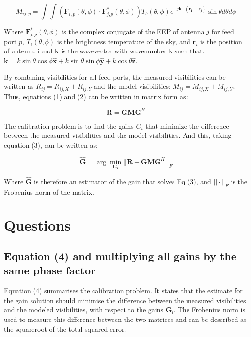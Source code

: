 \documentclass[12pt]{report} %
\begin{document}
\begin{equation}
    M_{ij,p} = \int\int (\mathbf{F}_{i,p}(\theta, \phi) \cdot \mathbf{F}_{j,p}^{*}(\theta, \phi))T_{b}(\theta, \phi)e^{-j\mathbf{k} \cdot (\mathbf{r_{i}}-\mathbf{r_{j}})} \sin\theta d\theta d\phi
\end{equation}

Where $\mathbf{F}_{j,p}^{*}(\theta, \phi)$ is the complex conjugate of the EEP of antenna $j$ for feed port $p$, $T_{b}(\theta, \phi)$ is the brightness temperature of the sky, and $\mathbf{r}_{i}$ is the position of antenna i and $\mathbf{k}$ is the wavevector with wavenumber k such that: $\mathbf{k} = k \sin \theta \cos \phi \mathbf{\hat{x}} + k \sin \theta \sin \phi \mathbf{\hat{y}} + k \cos \theta \mathbf{\hat{z}}$.

By combining visibilities for all feed ports, the measured visibilities can be written as $R_{ij} = R_{ij, X} + R_{ij, Y}$ and the model visibilities: $M_{ij} = M_{ij, X} + M_{ij, Y}$. Thus, equations (1) and (2) can be written in matrix form as:

\begin{equation}
    \mathbf{R} = \mathbf{G} \mathbf{M} \mathbf{G}^H
\end{equation}

The calibration problem is to find the gains $G_{i}$ that minimize the difference between the measured visibilities and the model visibilities. And this, taking equation (3), can be written as:

\begin{equation}
    \mathbf{\hat{G}} = \arg\min_{\mathbf{G_{i}}} ||\mathbf{R} - \mathbf{G} \mathbf{M} \mathbf{G}^H||_{F}
\end{equation}

Where $\mathbf{\hat{G}}$ is therefore an estimator of the gain that solves Eq (3), and $||\cdot||_{F}$ is the Frobenius norm of the matrix.

\chapter{Questions}

\section{Equation (4) and multiplying all gains by the same phase factor}

Equation (4) summarises the calibration problem. It states that the estimate for the gain solution should minimise the difference between the measured visibilities and the modeled visibilities, with respect to the gains $\mathbf{G_{i}}$. The Frobenius norm is used to measure this difference between the two matrices and can be described as the squareroot of the total squared error.
\end{document}
